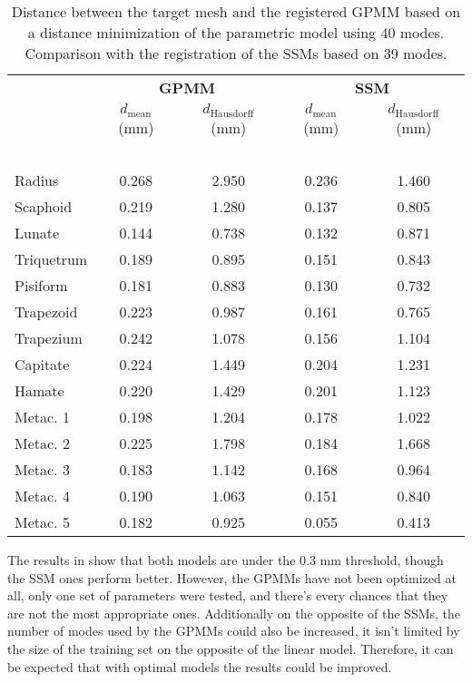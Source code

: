 \begin{table}[ht]
	\centering
	\begin{tabular}{lcc cc}
		\toprule
		& \multicolumn{2}{c}{\textbf{GPMM}} & \multicolumn{2}{c}{\textbf{SSM}} \\
		& $d_{\text{mean}}$ (mm) & $d_\text{Hausdorff}$ (mm)  & $d_{\text{mean}}$ (mm) & $d_\text{Hausdorff}$ (mm) \\ 
		\midrule  \ \vspace{-1.2mm} & & & &\\ 
		Radius		 & 0.268 & 2.950 	& 0.236 	& 1.460 \\
		Scaphoid 	 & 0.219 & 1.280 	& 0.137 	& 0.805 \\
		Lunate		 & 0.144 & 0.738 	& 0.132 	& 0.871 \\
		Triquetrum	 & 0.189 & 0.895 	& 0.151 	& 0.843 \\
		Pisiform	 & 0.181 & 0.883 	& 0.130 	& 0.732 \\
		Trapezoid	 & 0.223 & 0.987 	& 0.161 	& 0.765 \\
		Trapezium	 & 0.242 & 1.078 	& 0.156 	& 1.104 \\
		Capitate	 & 0.224 & 1.449 	& 0.204 	& 1.231 \\
		Hamate	 	 & 0.220 & 1.429 	& 0.201 	& 1.123 \\
		Metac. 1	 & 0.198 & 1.204 	& 0.178 	& 1.022 \\
		Metac. 2	 & 0.225 & 1.798 & 0.184 	& 1.668 \\
		Metac. 3	 & 0.183 & 1.142 & 0.168 	& 0.964 \\
		Metac. 4	 & 0.190 & 1.063 & 0.151 	& 0.840 \\
		Metac. 5	 & 0.182 & 0.925 & 0.055 	& 0.413 \\
		\bottomrule
	\end{tabular}
	\caption[Parametric registration of GPMM]{Distance between the target mesh and the registered GPMM based on a distance minimization of the parametric model using 40 modes. Comparison with the registration of the SSMs based on 39 modes.} 
	\label{tab:GP_registration_auto}
\end{table}


The results in  show that both models are under the $0.3$ mm threshold, though the SSM ones perform better. However, the GPMMs have not been optimized at all, only one set of parameters were tested, and there's every chances that they are not the most appropriate ones. Additionally on the opposite of the SSMs, the number of modes used by the GPMMs could also be increased, it isn't limited by the size of the training set on the opposite of the linear model. Therefore, it can be expected that with optimal models the results could be improved. 


